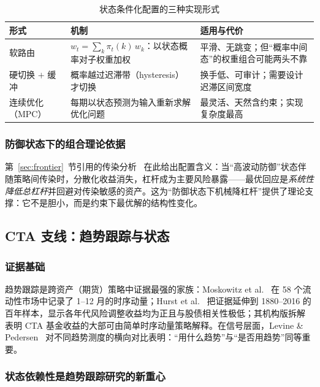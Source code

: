 \begin{table}[htbp]
\centering
\footnotesize
\begin{tabular}{>{\raggedright\arraybackslash}p{2.6cm}>{\raggedright\arraybackslash}p{4.7cm}>{\raggedright\arraybackslash}p{4.7cm}}
\toprule
\textbf{形式} & \textbf{机制} & \textbf{适用与代价} \\
\midrule
软路由 & $w_t = \sum_k \pi_t(k)\, w_k$：以状态概率对子权重加权 & 平滑、无跳变；但“概率中间态”的权重组合可能两头不靠 \\
硬切换 $+$ 缓冲 & 概率越过迟滞带（hysteresis）才切换 & 换手低、可审计；需要设计迟滞区间宽度 \\
连续优化（MPC） & 每期以状态预测为输入重新求解优化问题 & 最灵活、天然含约束；实现复杂度最高 \\
\bottomrule
\end{tabular}
\caption{状态条件化配置的三种实现形式}
\label{tab:allocation-forms}
\end{table}

\subsubsection{防御状态下的组合理论依据}

第~\ref{sec:frontier}~节引用的传染分析~\cite{scherer2020} 在此给出配置含义：当“高波动防御”状态伴随策略间传染时，分散化收益消失，杠杆成为主要风险暴露——最优回应是\emph{系统性降低总杠杆}并回避对传染敏感的资产。这为“防御状态下机械降杠杆”提供了理论支撑：它不是胆小，而是约束下最优解的结构性变化。

\subsection{CTA 支线：趋势跟踪与状态}

\subsubsection{证据基础}

趋势跟踪是跨资产（期货）策略中证据最强的家族：Moskowitz et al.~\cite{moskowitz2012} 在 58 个流动性市场中记录了 1--12 月的时序动量；Hurst et al.~\cite{hursto2017} 把证据延伸到 1880--2016 的百年样本，显示各年代风险调整收益均为正且与股债相关性极低；其机构版拆解~\cite{hurst2013} 表明 CTA 基金收益的大部可由简单时序动量策略解释。在信号层面，Levine \& Pedersen~\cite{levine2016} 对不同趋势测度的横向对比表明：“用什么趋势”与“是否用趋势”同等重要。

\subsubsection{状态依赖性是趋势跟踪研究的新重心}

